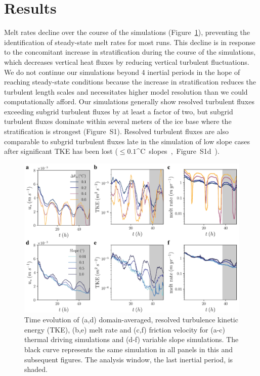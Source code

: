 \documentclass[tc, manuscript]{copernicus}
\begin{document}
\section{Results}\label{results}

Melt rates decline over the course of the simulations (Figure~\ref{fig:timeseries}), preventing the identification of steady-state melt rates for most runs. This decline is in response to the concomitant increase in stratification during the course of the simulations, which decreases vertical heat fluxes by reducing vertical turbulent fluctuations. We do not continue our simulations beyond 4 inertial periods in the hope of reaching steady-state conditions because the increase in stratification reduces the turbulent length scales and necessitates higher model resolution than we could computationally afford. Our simulations generally show resolved turbulent fluxes exceeding subgrid turbulent fluxes by at least a factor of two, but subgrid turbulent fluxes dominate within several meters of the ice base where the stratification is strongest (Figure~S1). Resolved turbulent fluxes are also comparable to subgrid turbulent fluxes late in the simulation of low slope cases after significant TKE has been lost ($\leq\!0.1$\unit{^{\circ}C} slopes, Figure~S1d).


\begin{figure}[t]
\includegraphics[width=12cm]{fig1.pdf}
\caption{Time evolution of (a,d) domain-averaged, resolved turbulence kinetic energy (TKE), (b,e) melt rate and (c,f) friction velocity for (a-c) thermal driving simulations and (d-f) variable slope simulations. The black curve represents the same simulation in all panels in this and subsequent figures. The analysis window, the last inertial period, is shaded.}
\label{fig:timeseries}
\end{figure}
\end{document}

